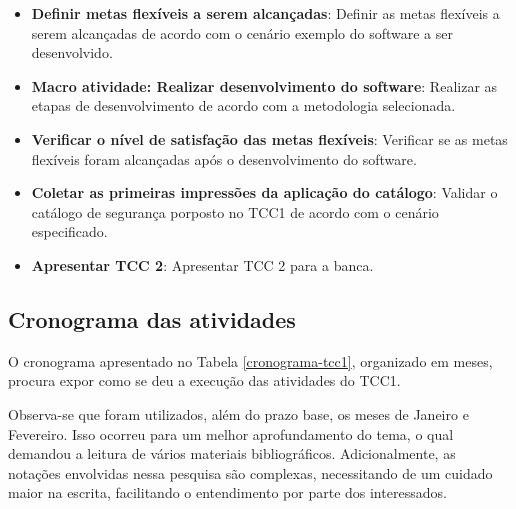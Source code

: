 \begin{itemize}
		
	\item \textbf{Definir metas flexíveis a serem alcançadas}: Definir as metas flexíveis a serem alcançadas de acordo com o cenário exemplo do software a ser desenvolvido.  
	
	\item \textbf{Macro atividade: Realizar desenvolvimento do software}: Realizar as etapas de desenvolvimento de acordo com a metodologia selecionada.
	
	\item \textbf{Verificar o nível de satisfação das metas flexíveis}: Verificar se as metas flexíveis foram alcançadas após o desenvolvimento do software.
	
	\item \textbf{Coletar as primeiras impressões da aplicação do catálogo}: Validar o catálogo de segurança porposto no TCC1 de acordo com o cenário especificado. 
	
	\item \textbf{Apresentar TCC 2}: Apresentar TCC 2 para a banca.
\end{itemize}

\subsection{Cronograma das atividades}

O cronograma apresentado no Tabela \ref{cronograma-tcc1}, organizado em meses,  procura expor como se deu a execução das atividades do TCC1. 

Observa-se que foram utilizados, além do prazo base, os meses de Janeiro e Fevereiro. Isso ocorreu para um melhor aprofundamento do tema, o qual demandou a leitura de vários materiais bibliográficos. Adicionalmente, as notações envolvidas nessa pesquisa são complexas, necessitando de um cuidado maior na escrita, facilitando o entendimento por parte dos interessados.

